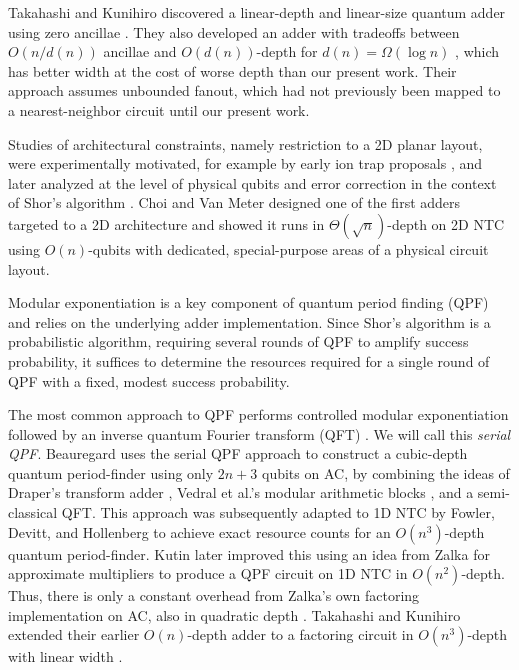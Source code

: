 \documentclass[twoside]{article}
\begin{document}
Takahashi and Kunihiro discovered a linear-depth
and linear-size quantum adder using zero ancillae \cite{Takahashi2005}.
They also developed an adder with tradeoffs between $O(n/d(n))$ ancillae and
$O(d(n))$-depth for $d(n) = \Omega(\log n)$ \cite{Takahashi2009}, which has
better width at the cost of worse depth than our present work. 
Their approach assumes unbounded fanout, which had not previously been mapped to a
nearest-neighbor circuit until our present work.

Studies of architectural constraints, namely restriction to a 2D planar layout, 
were experimentally motivated, for example by early ion trap proposals \cite{Kielpinski2002}, 
and later analyzed at the level of physical qubits and error correction in the context of Shor's algorithm \cite{Kubi09}.
Choi and Van Meter designed one of the first adders targeted to a 2D architecture 
and showed it runs in $\Theta(\sqrt{n})$-depth on \textsc{2D NTC} \cite{Choi2010}
using $O(n)$-qubits with dedicated, special-purpose areas of a physical
circuit layout.

Modular exponentiation is a key component of quantum period finding (QPF) and relies on the underlying adder implementation.
Since Shor's algorithm is a probabilistic algorithm, requiring several rounds of
QPF to amplify success probability, it suffices to determine the resources
required for a single round of QPF with a fixed, modest success probability.

The most common approach to QPF performs controlled
modular exponentiation followed by an inverse quantum Fourier transform
(QFT) \cite{Nielsen2000}. We will call this \emph{serial QPF}.
Beauregard \cite{Beauregard2002} uses the serial QPF approach
to construct a cubic-depth quantum period-finder using only $2n+3$ qubits on AC,
by combining the ideas of Draper's transform adder \cite{Draper2000},
Vedral et al.'s modular arithmetic blocks \cite{Vedral1996}, and a
semi-classical QFT.
This approach was subsequently adapted to \textsc{1D NTC} by Fowler, Devitt,
and Hollenberg
\cite{Fowler2004} to achieve exact resource counts for an $O(n^3)$-depth
quantum period-finder. Kutin \cite{Kutin2006} later improved this using
an idea from Zalka for approximate multipliers to produce a QPF circuit on
\textsc{1D NTC}
in $O(n^2)$-depth. Thus, there is only a constant overhead from
Zalka's own factoring implementation on \textsc{AC}, also in quadratic depth
\cite{Zalka1998}.
Takahashi and Kunihiro extended their earlier $O(n)$-depth adder to a factoring
circuit in $O(n^3)$-depth with linear width \cite{Takahashi2006}.
\end{document}
